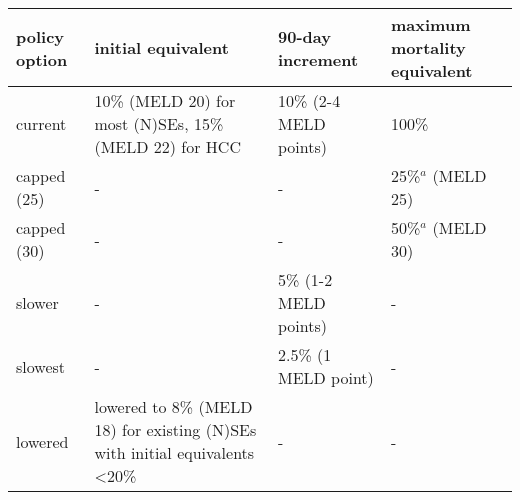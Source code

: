 \begin{tabular}{C{.18\linewidth} C{.35\linewidth} C{.3\linewidth} C{.28\linewidth}}
	
		\toprule
		policy option        & initial   equivalent                                                                  & 90-day   increment                            & maximum mortality  equivalent \\ \midrule
		current & 10\% (MELD 20) for most (N)SEs, 15\%  (MELD 22) for HCC                                                    & 10\%     (2-4 MELD points)                  & 100\%                \\
		capped (25)  & -  & - & 25\%$^a$ (MELD 25)     \\
		\addlinespace[0.3em]
		capped   (30) & - & - & 50\%$^a$   (MELD 30)   \\[.1em]
		slower        & - & 5\%       (1-2 MELD points)                 & -                    \\[0.3em]
		slowest       & - & 2.5\%   (1 MELD point)                      & -                    \\
		lowered       & lowered to 8\% (MELD 18) for existing (N)SEs with initial equivalents \textless{}20\% & -                                           & -                    \\ \bottomrule
	\end{tabular}
